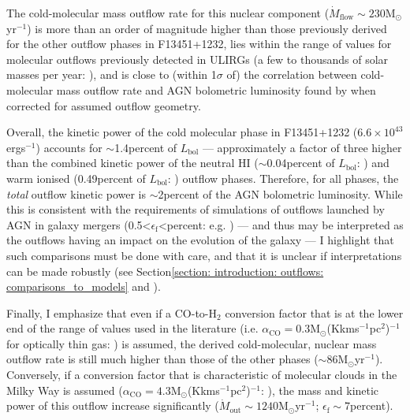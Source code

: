 The cold-molecular mass outflow rate for this nuclear component ($\dot{M}_\mathrm{flow}\sim230$\;M$_\odot$\;yr$^{-1}$) is more than an order of magnitude higher than those previously derived for the other outflow phases in F13451+1232, lies within the range of values for molecular outflows previously detected in ULIRGs (a few to thousands of solar masses per year: \citealt{Cicone2014, Pereira-Santaella2018, Fluetsch2019, Herrera-Camus2020, Lamperti2022}), and is close to (within 1$\sigma$ of) the correlation between cold-molecular mass outflow rate and AGN bolometric luminosity found by \citet{Fiore2017} when corrected for assumed outflow geometry.

Overall, the kinetic power of the cold molecular phase in F13451+1232 ($6.6\times10^{43}$\;ergs$^{-1}$) accounts for $\sim$1.4\;per\;cent of $L_\mathrm{bol}$ --- approximately a factor of three higher than the combined kinetic power of the neutral HI ($\sim$0.04\;per\;cent of $L_\mathrm{bol}$: \citealt{Morganti2013_4c1250}) and warm ionised (0.49\;per\;cent of $L_\mathrm{bol}$: \citealt{Rose2018}) outflow phases. Therefore, for all phases, the \textit{total} outflow kinetic power is $\sim$2\;per\;cent of the AGN bolometric luminosity. While this is consistent with the requirements of simulations of outflows launched by AGN in galaxy mergers (0.5\;\textless\;$\epsilon_\mathrm{f}$\;\textless{}\;per\;cent: e.g. \citealt{DiMatteo2005, Hopkins2010}) --- and thus may be interpreted as the outflows having an impact on the evolution of the galaxy --- I highlight that such comparisons must be done with care, and that it is unclear if interpretations can be made robustly (see Section\;\ref{section: introduction: outflows: comparisons_to_models} and \citealt{Harrison2018}).

Finally, I emphasize that even if a CO-to-H$_\mathrm{2}$ conversion factor that is at the lower end of the range of values used in the literature (i.e. $\alpha_\mathrm{CO}=0.3$\;M$_\odot$\;(K\;km\;s$^{-1}$\;pc$^2$)$^{-1}$ for optically thin gas: \citealt{Oosterloo2017, Oosterloo2019}) is assumed, the derived cold-molecular, nuclear mass outflow rate is still much higher than those of the other phases ($\sim$86\;M$_\odot$yr$^{-1}$). Conversely, if a conversion factor that is characteristic of molecular clouds in the Milky Way is assumed ($\alpha_\mathrm{CO}=4.3$\;M$_\odot$\;(K\;km\;s$^{-1}$\;pc$^2$)$^{-1}$: \citealt{Bolatto2013}), the mass and kinetic power of this outflow increase significantly ($\dot{M}_\mathrm{out}\sim1240$\;M$_\odot$\;yr$^{-1}$; $\epsilon_\mathrm{f}\sim7$\;per\;cent).

